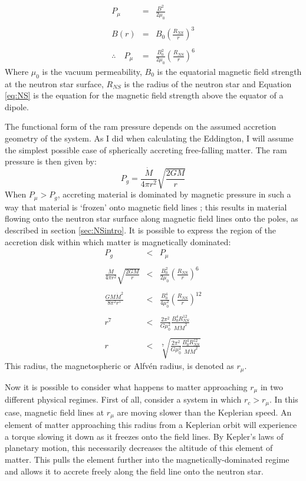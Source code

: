\begin{eqnarray}
P_\mu&=&\frac{B^2}{2\mu_0}\\ \nonumber \\
B(r)&=&B_0\left(\frac{R_{NS}}{r}\right)^3\label{eq:NS}\\ \nonumber \\
\therefore\quad P_\mu&=&\frac{B_0^2}{2\mu_0}\left(\frac{R_{NS}}{r}\right)^6
\end{eqnarray}
Where $\mu_0$ is the vacuum permeability, $B_0$ is the equatorial magnetic field strength at the neutron star surface, $R_{NS}$ is the radius of the neutron star and Equation \ref{eq:NS} is the equation for the magnetic field strength above the equator of a dipole.
\par The functional form of the ram pressure depends on the assumed accretion geometry of the system.  As I did when calculating the Eddington, I will assume the simplest possible case of spherically accreting free-falling matter.  The ram pressure is then given by:
\begin{equation}
P_g=\frac{\dot{M}}{4\pi r^2}\sqrt{\frac{2GM}{r}}
\end{equation}
When $P_\mu>P_g$, accreting material is dominated by magnetic pressure in such a way that material is `frozen' onto magnetic field lines \citep{Alfven_Waves}; this results in material flowing onto the neutron star surface along magnetic field lines onto the poles, as described in section \ref{sec:NSintro}.  It is possible to express the region of the accretion disk within which matter is magnetically dominated:
\begin{eqnarray}
P_g&<&P_\mu\\ \nonumber \\
\frac{\dot{M}}{4\pi r^2}\sqrt{\frac{2GM}{r}}&<&\frac{B_0^2}{2\mu_0}\left(\frac{R_{NS}}{r}\right)^6\\ \nonumber \\
\frac{GM\dot{M}^2}{8\pi^2 r^5}&<&\frac{B_0^4}{4\mu_0^2}\left(\frac{R_{NS}}{r}\right)^{12}\\ \nonumber \\
r^7&<&\frac{2\pi^2}{G\mu_0^2}\frac{B_0^4R_{NS}^{12}}{M\dot{M}^2}\\ \nonumber \\
r&<&\sqrt[7]{\frac{2\pi^2}{G\mu_0^2}\frac{B_0^4R_{NS}^{12}}{M\dot{M}^2}}
\end{eqnarray}
This radius, the magnetospheric or Alfv\'en radius, is denoted as $r_\mu$.
\par Now it is possible to consider what happens to matter approaching $r_\mu$ in two different physical regimes.  First of all, consider a system in which $r_c>r_\mu$.  In this case, magnetic field lines at $r_\mu$ are moving slower than the Keplerian speed.  An element of matter approaching this radius from a Keplerian orbit will experience a torque slowing it down as it freezes onto the field lines.  By Kepler's laws of planetary motion, this necessarily decreases the altitude of this element of matter.  This pulls the element further into the magnetically-dominated regime and allows it to accrete freely along the field line onto the neutron star.
